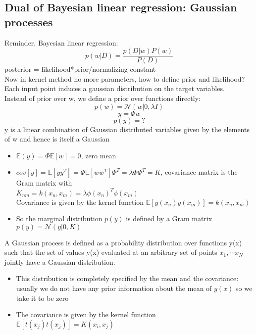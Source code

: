 \subsection{Dual of Bayesian linear regression: Gaussian processes}
    Reminder, Bayesian linear regression:
    $$p(w|D)=\frac{p(D|w)P(w)}{P(D)}$$
    posterior = likelihood*prior/normalizing constant\\
    Now in kernel method no more parameters, how to define prior and likelihood?\\
    Each input point induces a gaussian distribution on the target variables.\\
    Instead of prior over w, we define a prior over functions directly:
    $$p(w)=\mathcal{N}(w|0,\lambda I)$$ $$y=\Phi w$$ $$p(y)=?$$
    y is a linear combination of Gaussian distributed variables given by the elements of w and hence is itself a Gaussian
    \begin{itemize}
        \item $\mathbb{E}(y)=\Phi\mathbb{E}[w]=0$, zero mean
        \item $cov[y]=\mathbb{E}[yy^T]=\Phi\mathbb{E}[ww^T]\Phi^T=\lambda\Phi\Phi^T=K$, covariance matrix is the Gram matrix with\\ $K_{nm}=k(x_n,x_m)=\lambda\phi(x_n)^T\phi(x_m)$\\
        Covariance is given by the kernel function $\mathbb{E}[y(x_n)y(x_m)]=k(x_n,x_m)$
        \item So the marginal distribution $p(y)$ is defined by a Gram matrix\\ $p(y)=\mathcal{N}(y|0,K)$
    \end{itemize}
    A Gaussian process is defined as a probability distribution over functions y(x) such that the set of values y(x) evaluated at an arbitrary set of points $x_1,\cdots x_N$ jointly have a Gaussian distribution.
    \begin{itemize}
        \item This distribution is completely specified by the mean and the covariance: usually we do not have any prior information about the mean of $y(x)$ so we take it to be zero
        \item The covariance is given by the kernel function $\mathbb{E}[t(x_j)t(x_j)]=K(x_i,x_j)$
    \end{itemize}
